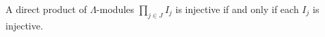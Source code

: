 A direct product of $\Lambda$-modules $\prod_{j \in J} I_j$ is injective if and only if each $I_j$ is injective.
